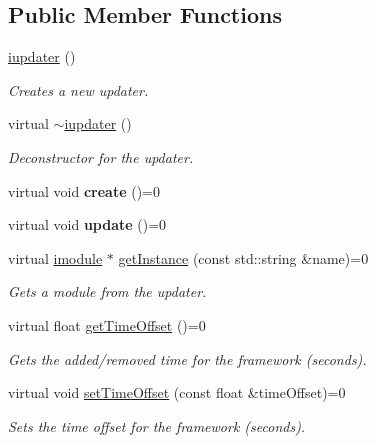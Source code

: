\subsection*{Public Member Functions}
\begin{DoxyCompactItemize}
\item 
\hyperlink{classflounder_1_1iupdater_acbbc1766a8c236ba89ff55eee9b25850}{iupdater} ()
\begin{DoxyCompactList}\small\item\em Creates a new updater. \end{DoxyCompactList}\item 
virtual \hyperlink{classflounder_1_1iupdater_a70569371d9b898b7d30442a4463fbee4}{$\sim$iupdater} ()
\begin{DoxyCompactList}\small\item\em Deconstructor for the updater. \end{DoxyCompactList}\item 
\mbox{\label{classflounder_1_1iupdater_adf13e2f8614c4c404cf3b4beb44f2674}} 
virtual void {\bfseries create} ()=0
\item 
\mbox{\label{classflounder_1_1iupdater_a9f9102652e1ec25f7e9fc9b1cd57a041}} 
virtual void {\bfseries update} ()=0
\item 
virtual \hyperlink{classflounder_1_1imodule}{imodule} $\ast$ \hyperlink{classflounder_1_1iupdater_a391b1788b5c139b199ed48033da1b88d}{get\+Instance} (const std\+::string \&name)=0
\begin{DoxyCompactList}\small\item\em Gets a module from the updater. \end{DoxyCompactList}\item 
virtual float \hyperlink{classflounder_1_1iupdater_a4e682002890f952dee48c646fce39824}{get\+Time\+Offset} ()=0
\begin{DoxyCompactList}\small\item\em Gets the added/removed time for the framework (seconds). \end{DoxyCompactList}\item 
virtual void \hyperlink{classflounder_1_1iupdater_a5ce1862ec2d0e6c4f61b026922379dd2}{set\+Time\+Offset} (const float \&time\+Offset)=0
\begin{DoxyCompactList}\small\item\em Sets the time offset for the framework (seconds). \end{DoxyCompactList}\item 

\end{DoxyCompactItemize}
